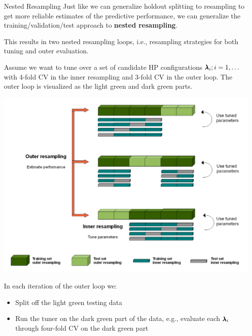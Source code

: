     \begin{frame}[c,allowframebreaks]{Nested Resampling}
    Just like we can generalize holdout splitting to resampling to get more reliable estimates of the predictive performance, we can generalize the training/validation/test approach to \textbf{nested resampling}.

    \bigskip

    This results in two nested resampling loops, i.e., resampling strategies for both tuning and outer evaluation.

    \framebreak

    Assume we want to tune over a set of candidate HP configurations $\pmb{\lambda}_i; i = 1, \dots$ with 4-fold CV in the inner resampling and 3-fold CV in the outer loop. The outer loop is visualized as the light green and dark green parts.

    \begin{center}
        \includegraphics[height=0.6\textheight]{Nested_Resampling.png}
    \end{center}

    \framebreak

    \begin{footnotesize}
    In each iteration of the outer loop we:
    \begin{itemize}
    \item Split off the light green testing data
    \item Run the tuner on the dark green part of the data, e.g.,
      evaluate each $\pmb{\lambda}_i$ through four-fold CV on the dark green part
    \end{itemize}
    \end{footnotesize}


\end{frame}
